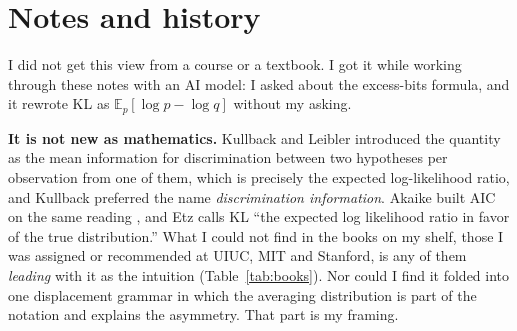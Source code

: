 \documentclass[11pt,oneside]{book}
\newcommand{\E}{\mathbb{E}}
\theoremstyle{definition}
\theoremstyle{plain}
\theoremstyle{remark}
\begin{document}
\section{Notes and history}

I did not get this view from a course or a textbook. I got it while working through these notes with an AI model:
I asked about the excess-bits formula, and it rewrote KL as $\E_p[\log p-\log q]$ without my asking.

\textbf{It is not new as mathematics.} Kullback and Leibler \cite{kullback1951} introduced the quantity as the mean
information for discrimination between two hypotheses per observation from one of them, which is precisely the
expected log-likelihood ratio, and Kullback \cite{kullback1959} preferred the name \emph{discrimination information}.
Akaike built AIC on the same reading \cite{akaike1973}, and Etz \cite{etz2018} calls KL ``the expected log likelihood
ratio in favor of the true distribution.'' What I could not find in the books on my shelf, those I was assigned or
recommended at UIUC, MIT and Stanford, is any of them \emph{leading} with it as the intuition (Table~\ref{tab:books}).
Nor could I find it folded into one displacement grammar in which the averaging distribution is part of the notation
and explains the asymmetry. That part is my framing.
\end{document}
